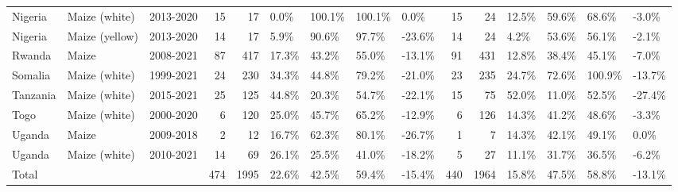 \begin{table}[ht]
\begin{tabular}{lllrrllllrrllll}
  Nigeria & Maize (white) & 2013-2020 &  15 &  17 & 0.0\% & 100.1\% & 100.1\% & 0.0\% &  15 &  24 & 12.5\% & 59.6\% & 68.6\% & -3.0\% \\ 
  Nigeria & Maize (yellow) & 2013-2020 &  14 &  17 & 5.9\% & 90.6\% & 97.7\% & -23.6\% &  14 &  24 & 4.2\% & 53.6\% & 56.1\% & -2.1\% \\ 
  Rwanda & Maize & 2008-2021 &  87 & 417 & 17.3\% & 43.2\% & 55.0\% & -13.1\% &  91 & 431 & 12.8\% & 38.4\% & 45.1\% & -7.0\% \\ 
  Somalia & Maize (white) & 1999-2021 &  24 & 230 & 34.3\% & 44.8\% & 79.2\% & -21.0\% &  23 & 235 & 24.7\% & 72.6\% & 100.9\% & -13.7\% \\ 
  Tanzania & Maize (white) & 2015-2021 &  25 & 125 & 44.8\% & 20.3\% & 54.7\% & -22.1\% &  15 &  75 & 52.0\% & 11.0\% & 52.5\% & -27.4\% \\ 
  Togo & Maize (white) & 2000-2020 &   6 & 120 & 25.0\% & 45.7\% & 65.2\% & -12.9\% &   6 & 126 & 14.3\% & 41.2\% & 48.6\% & -3.3\% \\ 
  Uganda & Maize & 2009-2018 &   2 &  12 & 16.7\% & 62.3\% & 80.1\% & -26.7\% &   1 &   7 & 14.3\% & 42.1\% & 49.1\% & 0.0\% \\ 
  Uganda & Maize (white) & 2010-2021 &  14 &  69 & 26.1\% & 25.5\% & 41.0\% & -18.2\% &   5 &  27 & 11.1\% & 31.7\% & 36.5\% & -6.2\% \\ 
  Total &  &  & 474 & 1995 & 22.6\% & 42.5\% & 59.4\% & -15.4\% & 440 & 1964 & 15.8\% & 47.5\% & 58.8\% & -13.1\% \\ 
   \hline
\end{tabular}
\end{table}
